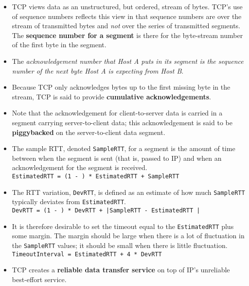 \begin{itemize}
\item
TCP views data as an unstructured, but ordered, stream of bytes. TCP's use of sequence numbers reflects this view in that sequence numbers are over the stream of transmitted bytes and \textit{not} over the series of transmitted segments. The \textbf{sequence number for a segment} is there for the byte-stream number of the first byte in the segment.

\item
The \textit{acknowledgement number that Host A puts in its segment is the sequence number of the next byte Host A is expecting from Host B}.

\item
Because TCP only acknowledges bytes up to the first missing byte in the stream, TCP is said to provide \textbf{cumulative acknowledgements}.

\item
Note that the acknowledgement for client-to-server data is carried in a segment carrying server-to-client data; this acknowledgement is said to be \textbf{piggybacked} on the server-to-client data segment.

\item
The sample RTT, denoted \texttt{SampleRTT}, for a segment is the amount of time between when the segment is sent (that is, passed to IP) and when an acknowledgement for the segment is received.\\
\hspace*{1em}\texttt{EstimatedRTT = (1 - \alpha) * EstimatedRTT + \alpha * SampleRTT }

\item
The RTT variation, \texttt{DevRTT}, is defined as an estimate of how much \texttt{SampleRTT} typically deviates from \texttt{EstimatedRTT}.\\
\hspace*{1em}\texttt{DevRTT = (1 - \beta) * DevRTT + \beta * |SampleRTT - EstimatedRTT |}

\item
It is therefore desirable to set the timeout equal to the \texttt{EstimatedRTT} plus some margin. The margin should be large when there is a lot of fluctuation in the \texttt{SampleRTT} values; it should be small when there is little fluctuation.\\
\hspace*{1em}\texttt{TimeoutInterval = EstimatedRTT + 4 * DevRTT}

\item
TCP creates a \textbf{reliable data transfer service} on top of IP's unreliable best-effort service.


\end{itemize}
